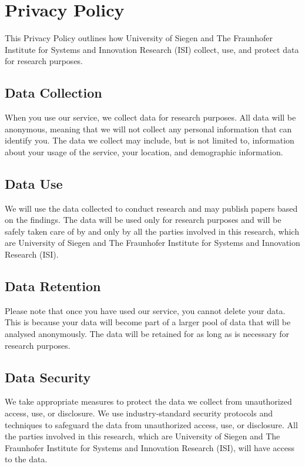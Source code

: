 \clearpage %

\chapter{Privacy Policy}
\label{appendix:privacy}

This Privacy Policy outlines how University of Siegen and The Fraunhofer Institute for Systems and Innovation Research (ISI) collect, use, and protect data for research purposes.

\section*{Data Collection}

When you use our service, we collect data for research purposes. All data will be anonymous, meaning that we will not collect any personal information that can identify you. The data we collect may include, but is not limited to, information about your usage of the service, your location, and demographic information. 

\section*{Data Use}

We will use the data collected to conduct research and may publish papers based on the findings. The data will be used only for research purposes and will be safely taken care of by and only by all the parties involved in this research, which are University of Siegen and The Fraunhofer Institute for Systems and Innovation Research (ISI).

\section*{Data Retention}

Please note that once you have used our service, you cannot delete your data. This is because your data will become part of a larger pool of data that will be analysed anonymously. The data will be retained for as long as is necessary for research purposes.

\section*{Data Security}

We take appropriate measures to protect the data we collect from unauthorized access, use, or disclosure. We use industry-standard security protocols and techniques to safeguard the data from unauthorized access, use, or disclosure. All the parties involved in this research, which are University of Siegen and The Fraunhofer Institute for Systems and Innovation Research (ISI), will have access to the data.


